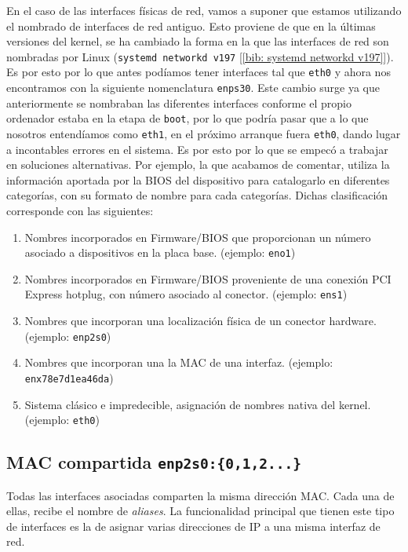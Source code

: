 \documentclass[12pt]{article}
\begin{document}
	\noindent En el caso de las interfaces físicas de red, vamos a suponer que estamos utilizando el nombrado de interfaces de red antiguo. Esto proviene de que en la últimas versiones del kernel, se ha cambiado la forma en la que las interfaces de red son nombradas por Linux (\texttt{systemd networkd v197} [\ref{bib: systemd networkd v197}]). Es por esto por lo que antes podíamos tener interfaces tal que \texttt{eth0} y ahora nos encontramos con la siguiente nomenclatura \texttt{enps30}. Este cambio surge ya que anteriormente se nombraban las diferentes interfaces conforme el propio ordenador estaba en la etapa de \texttt{boot}, por lo que podría pasar que a lo que nosotros entendíamos como \texttt{eth1}, en el próximo arranque fuera \texttt{eth0}, dando lugar a incontables errores en el sistema. Es por esto por lo que se empecó a trabajar en soluciones alternativas. Por ejemplo, la que acabamos de comentar, utiliza la información aportada por la BIOS del dispositivo para catalogarlo en diferentes categorías, con su formato de nombre para cada categorías. Dichas clasificación corresponde con las siguientes:
	\begin{enumerate}
		\item Nombres incorporados en Firmware/BIOS que proporcionan un número asociado a dispositivos en la placa base. (ejemplo: \texttt{eno1})
		\item Nombres incorporados en Firmware/BIOS proveniente de una conexión PCI Express hotplug, con número asociado al conector. (ejemplo: \texttt{ens1})
		\item Nombres que incorporan una localización física de un conector hardware. (ejemplo: \texttt{enp2s0})
		\item Nombres que incorporan una la MAC de una interfaz. (ejemplo: \texttt{enx78e7d1ea46da})
		\item Sistema clásico e impredecible, asignación de nombres nativa del kernel. (ejemplo: \texttt{eth0})
	\end{enumerate}
	
	\pagebreak
	
	\subsection{MAC compartida \texttt{enp2s0:\{0,1,2...\}}}
	\par \noindent Todas las interfaces asociadas comparten la misma dirección MAC. Cada una de ellas, recibe el nombre de \textit{aliases}. La funcionalidad principal que tienen este tipo de interfaces es la de asignar varias direcciones de IP a una misma interfaz de red.
	
\end{document}
